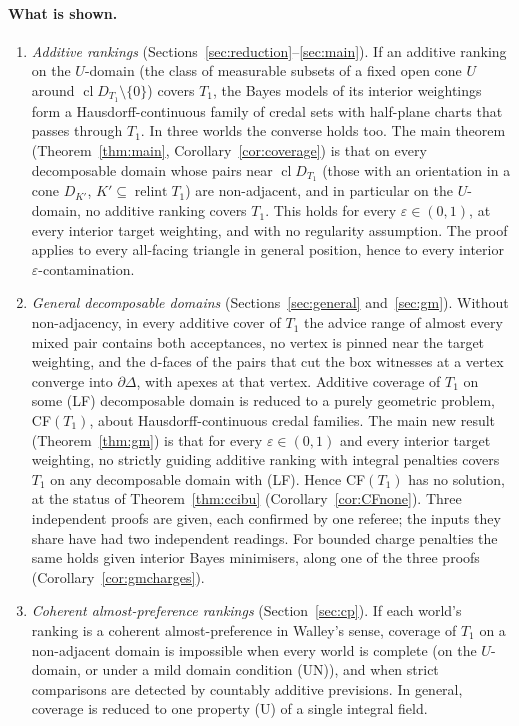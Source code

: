 \documentclass[11pt]{article}
\theoremstyle{definition}
\theoremstyle{remark}
\newcommand{\cl}{\operatorname{cl}}
\newcommand{\relint}{\operatorname{relint}}
\begin{document}
\paragraph{What is shown.}
\begin{enumerate}[leftmargin=*]
\item \emph{Additive rankings} (Sections~\ref{sec:reduction}--\ref{sec:main}). If an additive ranking on the $U$-domain (the class of measurable subsets of a fixed open cone $U$ around $\cl D_{T_1}\setminus\{0\}$) covers $T_1$, the Bayes models of its interior weightings form a Hausdorff-continuous family of credal sets with half-plane charts that passes through $T_1$. In three worlds the converse holds too. The main theorem (Theorem~\ref{thm:main}, Corollary~\ref{cor:coverage}) is that on every decomposable domain whose pairs near $\cl D_{T_1}$ (those with an orientation in a cone $D_{K'}$, $K'\subseteq\relint T_1$) are non-adjacent, and in particular on the $U$-domain, no additive ranking covers $T_1$. This holds for every $\varepsilon\in(0,1)$, at every interior target weighting, and with no regularity assumption. The proof applies to every all-facing triangle in general position, hence to every interior $\varepsilon$-contamination.
\item \emph{General decomposable domains} (Sections~\ref{sec:general} and~\ref{sec:gm}). Without non-adjacency, in every additive cover of $T_1$ the advice range of almost every mixed pair contains both acceptances, no vertex is pinned near the target weighting, and the d-faces of the pairs that cut the box witnesses at a vertex converge into $\partial\Delta$, with apexes at that vertex. Additive coverage of $T_1$ on some (LF) decomposable domain is reduced to a purely geometric problem, CF$(T_1)$, about Hausdorff-continuous credal families. The main new result (Theorem~\ref{thm:gm}) is that for every $\varepsilon\in(0,1)$ and every interior target weighting, no strictly guiding additive ranking with integral penalties covers $T_1$ on any decomposable domain with (LF). Hence CF$(T_1)$ has no solution, at the status of Theorem~\ref{thm:ccibu} (Corollary~\ref{cor:CFnone}). Three independent proofs are given, each confirmed by one referee; the inputs they share have had two independent readings. For bounded charge penalties the same holds given interior Bayes minimisers, along one of the three proofs (Corollary~\ref{cor:gmcharges}).
\item \emph{Coherent almost-preference rankings} (Section~\ref{sec:cp}). If each world's ranking is a coherent almost-preference in Walley's sense, coverage of $T_1$ on a non-adjacent domain is impossible when every world is complete (on the $U$-domain, or under a mild domain condition (UN)), and when strict comparisons are detected by countably additive previsions. In general, coverage is reduced to one property (U) of a single integral field.

\end{enumerate}
\end{document}
